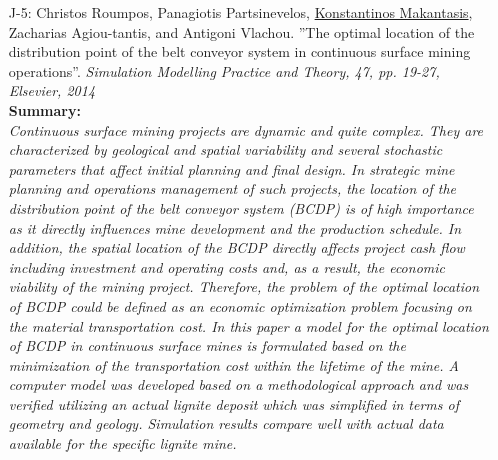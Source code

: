 \documentclass[a4paper,10pt]{article}
\begin{document}
\begin{itemize}
	\item [J-5:]Christos Roumpos, Panagiotis Partsinevelos, \underline{Konstantinos Makantasis}, Zacharias Agiou-tantis, and Antigoni Vlachou. ''The optimal location of the distribution point of the belt conveyor system in continuous surface mining operations''. \textit{Simulation Modelling Practice and Theory, 47, pp. 19-27, Elsevier, 2014}\\
	\textbf{Summary:}\\
	\textit{Continuous surface mining projects are dynamic and quite complex. They are characterized by geological and spatial variability and several stochastic parameters that affect initial planning and final design. In strategic mine planning and operations management of such projects, the location of the distribution point of the belt conveyor system (BCDP) is of high importance as it directly influences mine development and the production schedule. In addition, the spatial location of the BCDP directly affects project cash flow including investment and operating costs and, as a result, the economic viability of the mining project. Therefore, the problem of the optimal location of BCDP could be defined as an economic optimization problem focusing on the material transportation cost. In this paper a model for the optimal location of BCDP in continuous surface mines is formulated based on the minimization of the transportation cost within the lifetime of the mine. A computer model was developed based on a methodological approach and was verified utilizing an actual lignite deposit which was simplified in terms of geometry and geology. Simulation results compare well with actual data available for the specific lignite mine.}
	

\end{itemize}
\end{document}
